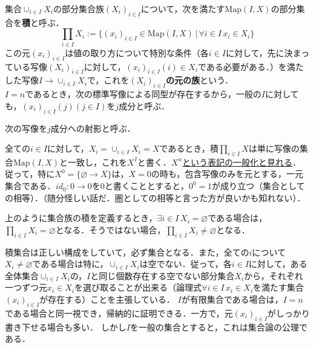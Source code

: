 \documentclass[uplatex, 12pt, dvipdfmx]{jsreport}
\begin{document}
\begin{definition}[積]
    集合$\cup_{i\in I}X_i$の部分集合族$(X_i)_{i\in I}$について，次を満たす$\mathrm{Map}(I,X)$の部分集合を\textbf{積}と呼ぶ．
    $$\prod_{i\in I}X_i := \{ (x_i)_{i\in I}\in \mathrm{Map}(I,X)\, |\, \forall i\in I \, x_i\in X_i \}$$
    この元$(x_i)_{i\in I}$は値の取り方について特別な条件（各$i\in I$に対して，先に決まっている写像$(X_i)_{i\in I}$に対して，$(x_i)_{i\in I}(i)\in X_i$である必要がある．）を満たした写像$I\to \cup_{i\in I}X_i$で，これを\textbf{$(X_i)_{i\in I}$の元の族}という．\\
    $I=n$であるとき，次の標準写像による同型が存在するから，一般の$I$に対しても，$(x_i)_{i\in I}(j) (j\in I)$を$j$成分と呼ぶ．
    \begin{center}\end{center}
    次の写像を$j$成分への射影と呼ぶ．
    \begin{center}\end{center}
    全ての$i\in I$に対して，$X_i=\cup_{i\in I}X_i=X$であるとき，積$\prod_{i\in I}X$は単に写像の集合$\mathrm{Map}(I,X)$と一致し，これを$X^I$と書く．\underline{$X^n$という表記の一般化と見れる}．\\
    従って，特に$X^0=\{\varnothing\to X\}$は，$X=0$の時も，包含写像のみを元とする，一元集合である．$id_0:0\to 0$を$0$と書くこととすると，$0^0=1$が成り立つ（集合としての相等）．（随分怪しい話だ．圏としての相等と言った方が良いかも知れない）．
\end{definition}
\begin{axiom}
    上のように集合族の積を定義するとき，$\exists i\in I\, X_i=\varnothing$である場合は，$\prod_{i\in I}X_i=\varnothing$となる．そうではない場合，$\prod_{i\in I}X_i\ne\varnothing$となる．
\end{axiom}
\begin{remark}
    積集合は正しい構成をしていて，必ず集合となる．また，全ての$i$について$X_i\ne\varnothing$である場合は特に，$\cup_{i\in I}X_i$は空でない．従って，各$i\in I$に対して，ある全体集合$\cup_{i\in I}X_i$の，$I$と同じ個数存在する空でない部分集合$X_i$から，それぞれ一つずつ元$x_i\in X_i$を選び取ることが出来る（論理式$\forall i\in I\, x_i\in X_i$を満たす集合$(x_i)_{i\in I}$が存在する）ことを主張している．
    $I$が有限集合である場合は，$I=n$である場合と同一視でき，帰納的に証明できる．一方で，元$(x_i)_{i\in I}$がしっかり書き下せる場合も多い．
    しかし$I$を一般の集合とすると，これは集合論の公理である．
\end{remark}
\end{document}
